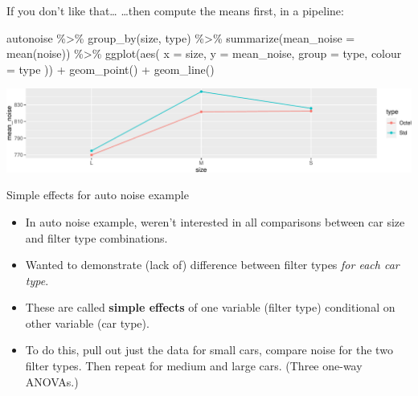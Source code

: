 \documentclass[
  ignorenonframetext,
]{beamer}
\newenvironment{Shaded}{\begin{snugshade}}{\end{snugshade}}
\newcommand{\AttributeTok}[1]{\textcolor[rgb]{0.40,0.45,0.13}{#1}}
\newcommand{\FunctionTok}[1]{\textcolor[rgb]{0.28,0.35,0.67}{#1}}
\newcommand{\NormalTok}[1]{\textcolor[rgb]{0.00,0.23,0.31}{#1}}
\newcommand{\SpecialCharTok}[1]{\textcolor[rgb]{0.37,0.37,0.37}{#1}}
\begin{document}
\begin{frame}[fragile]{If you don't like that\ldots}
\protect\hypertarget{if-you-dont-like-that}{}
\ldots then compute the means first, in a pipeline:

\footnotesize

\begin{Shaded}
\begin{Highlighting}[]
\NormalTok{autonoise }\SpecialCharTok{\%\textgreater{}\%}
  \FunctionTok{group\_by}\NormalTok{(size, type) }\SpecialCharTok{\%\textgreater{}\%}
  \FunctionTok{summarize}\NormalTok{(}\AttributeTok{mean\_noise =} \FunctionTok{mean}\NormalTok{(noise)) }\SpecialCharTok{\%\textgreater{}\%}
  \FunctionTok{ggplot}\NormalTok{(}\FunctionTok{aes}\NormalTok{(}
    \AttributeTok{x =}\NormalTok{ size, }\AttributeTok{y =}\NormalTok{ mean\_noise, }\AttributeTok{group =}\NormalTok{ type,}
    \AttributeTok{colour =}\NormalTok{ type}
\NormalTok{  )) }\SpecialCharTok{+} \FunctionTok{geom\_point}\NormalTok{() }\SpecialCharTok{+} \FunctionTok{geom\_line}\NormalTok{()}
\end{Highlighting}
\end{Shaded}

\includegraphics{anova_files/figure-beamer/bAnova-31-1.pdf}

\normalsize
\end{frame}

\begin{frame}{Simple effects for auto noise example}
\protect\hypertarget{simple-effects-for-auto-noise-example}{}
\begin{itemize}
\item
  In auto noise example, weren't interested in all comparisons between
  car size and filter type combinations.
\item
  Wanted to demonstrate (lack of) difference between filter types
  \emph{for each car type}.
\item
  These are called \textbf{simple effects} of one variable (filter type)
  conditional on other variable (car type).
\item
  To do this, pull out just the data for small cars, compare noise for
  the two filter types. Then repeat for medium and large cars. (Three
  one-way ANOVAs.)
\end{itemize}
\end{frame}
\end{document}
